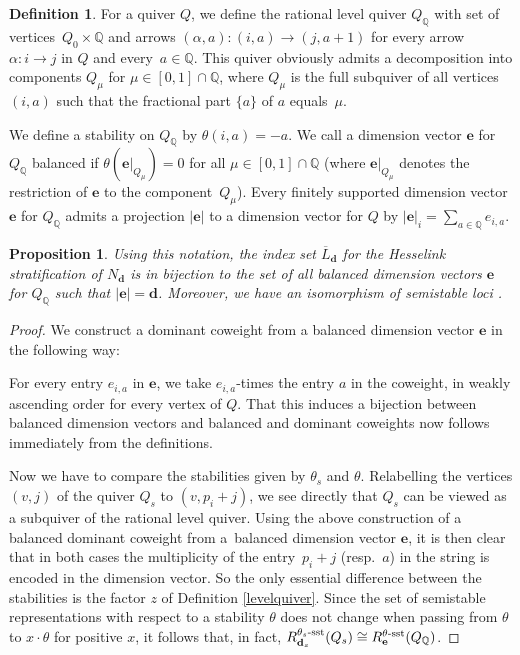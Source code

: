 \documentclass[10pt,a4paper]{amsart}
\numberwithin{equation}{section}
\newtheorem{Proposition}[Theorem]{Proposition}
\theoremstyle{definition}
\newtheorem{Definition}[Theorem]{Definition}
\begin{document}
\begin{Definition}
For a quiver $Q$, we define the rational level quiver $Q_{\mathbb{Q}}$ with set of vertices~${Q_0 \times \mathbb{Q}}$ and arrows
$
(\alpha, a) \colon (i,a) \rightarrow (j, a+1)
$
for every arrow~${\alpha\colon i \rightarrow j}$ in $Q$ and every~${a \in \mathbb{Q}}$. This quiver obviously admits a decomposition into components $Q_{\mu}$ for $\mu \in [0,1] \cap \mathbb{Q}$, where $Q_{\mu}$ is the full subquiver of all vertices $(i,a)$ such that the fractional part $\{a\}$ of $a$ equals~$\mu$.

We define a stability on $Q_{\mathbb{Q}}$ by $\theta(i,a) = -a$.
We call a dimension vector $\mathbf{e}$ for $Q_\mathbb{Q}$ balanced if $\theta(\mathbf{e}|_{Q_\mu})=0$
for all $\mu\in[0,1]\cap\mathbb{Q}$ (where $\mathbf{e}|_{Q_\mu}$ denotes the restriction of $\mathbf{e}$ to the component~$Q_\mu$). Every finitely supported dimension vector $\mathbf{e}$ for $Q_\mathbb{Q}$ admits a projection $|\mathbf{e}|$ to a dimension vector for $Q$ by $|\mathbf{e}|_i=\sum_{a\in\mathbb{Q}}e_{i,a}.$
\end{Definition}

\begin{Proposition}\label{pro par1}
Using this notation, the index set ${\overline{L}_{\mathbf{d}}}$ for the Hesselink stratification of $N_{\mathbf{d}}$ is in bijection to the set of all balanced dimension vectors $\mathbf{e}$ for $Q_\mathbb{Q}$ such that $|\mathbf{e}|=\mathbf{d}$. Moreover, we have an isomorphism of semistable loci .
\end{Proposition}

\begin{proof}
We construct a dominant coweight from a balanced dimension vector $\mathbf{e}$ in the following way:

For every entry $e_{i,a}$ in $\mathbf{e}$, we take $e_{i,a}$-times the entry $a$ in the coweight, in weakly ascending order for every vertex of $Q$. That this induces a bijection between balanced dimension vectors and balanced and dominant coweights now follows immediately from the definitions.

Now we have to compare the stabilities given by $\theta_s$ and $\theta$. Relabelling the vertices $(v,j)$ of the quiver $Q_s$ to $(v, p_i+j)$, we see directly that $Q_s$ can be viewed as a subquiver of the rational level quiver. Using the above construction of a balanced dominant coweight from a~balanced dimension vector $\mathbf{e}$, it is then clear that in both cases the multiplicity of the entry~${p_i +j}$ (resp.~$a$) in the string is encoded in the dimension vector. So the only essential difference between the stabilities is the factor $z$ of Definition \ref{levelquiver}. Since the set of semistable representations with respect to a stability $\theta$ does not change when passing from $\theta$ to $x \cdot \theta$ for positive $x$, it follows that, in fact, $R^{\theta_s\text{\rm -sst}}_{\mathbf{d}_s}(Q_s) \cong R^{\theta\text{\rm -sst}}_{\mathbf{e}}(Q_{\mathbb{Q}})$.
\end{proof}
\end{document}
